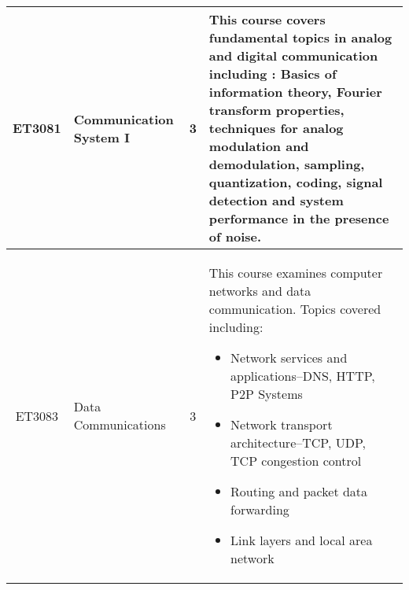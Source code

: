 \documentclass{article}
\begin{document}
\begin{center}
\begin{tabular}{ | c | B{5.4cm} | c | p{6.8cm} |}
            ET3081 & Communication System I & 3 & This course covers fundamental topics in analog and digital communication including : Basics of information theory, Fourier transform properties, techniques for analog modulation and demodulation, sampling, quantization, coding, signal detection and system performance in the presence of noise. \\ \hline                              

             ET3083 & Data Communications & 3 & This course examines computer networks and data communication. Topics covered including:
             \begin{itemize}
                 \item Network services and applications--DNS, HTTP, P2P Systems
                 \item Network transport architecture--TCP, UDP, TCP congestion control
                 \item Routing and packet data forwarding
                 \item Link layers and local area network
             \end{itemize}               \\ \hline  
                                            
        \end{tabular}
    \end{center}     
    
    \newpage
    
\end{document}
